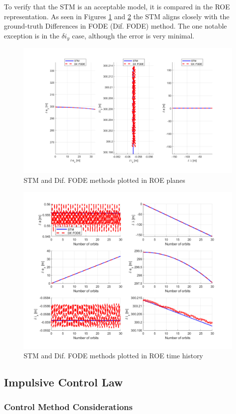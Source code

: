 To verify that the STM is an acceptable model, it is compared in the ROE representation. As seen in Figures \ref{fig:roe_plane_compare_method} and \ref{fig:roe_time_compare_method} the STM aligns closely with the ground-truth Differences in FODE (Dif. FODE) method. The one notable exception is in the $\delta i_y$ case, although the error is very minimal.

\begin{figure}[H]
    \centering
    \includegraphics[width=0.75\linewidth]{sim/figures/PS5/mode_1_ROE_Planes.png}
    \caption{STM and Dif. FODE methods plotted in ROE planes}
    \label{fig:roe_plane_compare_method}
\end{figure}
\begin{figure}[H]
    \centering
    \includegraphics[width=0.75\linewidth]{sim/figures/PS5/mode_1_ROE_Time.png}
    \caption{STM and Dif. FODE methods plotted in ROE time history}
    \label{fig:roe_time_compare_method}
\end{figure}
\subsection{Impulsive Control Law}

\subsubsection{Control Method Considerations}\label{sec:control_considerations}


